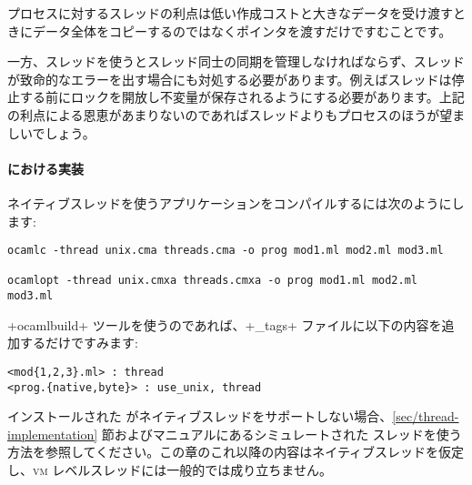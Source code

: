 プロセスに対するスレッドの利点は低い作成コストと大きなデータを受け渡すときにデータ全体をコピーするのではなくポインタを渡すだけですむことです。

一方、スレッドを使うとスレッド同士の同期を管理しなければならず、スレッドが致命的なエラーを出す場合にも対処する必要があります。例えばスレッドは停止する前にロックを開放し不変量が保存されるようにする必要があります。上記の利点による恩恵があまりないのであればスレッドよりもプロセスのほうが望ましいでしょう。

\paragraph{{\ocaml} における実装}

ネイティブスレッドを使うアプリケーションをコンパイルするには次のようにします:
\begin{lstlisting}
ocamlc -thread unix.cma threads.cma -o prog mod1.ml mod2.ml mod3.ml

ocamlopt -thread unix.cmxa threads.cmxa -o prog mod1.ml mod2.ml mod3.ml
\end{lstlisting}
\ml+ocamlbuild+ ツールを使うのであれば、\ml+_tags+ ファイルに以下の内容を追加するだけですみます:
\begin{lstlisting}
<mod{1,2,3}.ml> : thread
<prog.{native,byte}> : use_unix, thread
\end{lstlisting}
%
インストールされた \ocaml がネイティブスレッドをサポートしない場合、\ref{sec/thread-implementation} 節およびマニュアルにあるシミュレートされた   スレッドを使う方法を参照してください。この章のこれ以降の内容はネイティブスレッドを仮定し、\textsc{vm} レベルスレッドには一般的では成り立ちません。

